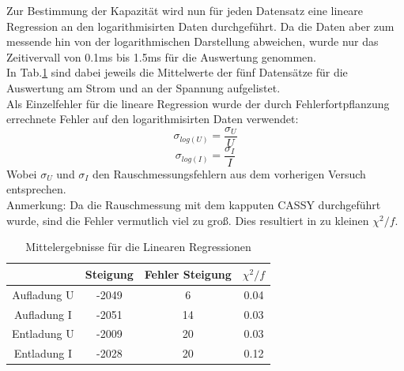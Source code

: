 \documentclass[12pt,a4paper]{article}
\begin{document}
Zur Bestimmung der Kapazität wird nun für jeden Datensatz eine lineare Regression an den logarithmisirten Daten durchgeführt. Da die Daten aber zum messende hin von der logarithmischen Darstellung abweichen, wurde nur das Zeitivervall von 0.1ms bis 1.5ms für die Auswertung genommen.\\
In Tab.\ref{tab:kond_linreg} sind dabei jeweils die Mittelwerte der fünf Datensätze für die Auswertung am Strom und an der Spannung aufgelistet.\\
Als Einzelfehler für die lineare Regression wurde der durch Fehlerfortpflanzung errechnete Fehler auf den logarithmisirten Daten verwendet:
\begin{equation}
\sigma_{log(U)} = \dfrac{\sigma_U}{U}
\end{equation}
\begin{equation}
\sigma_{log(I)} = \dfrac{\sigma_I}{I}
\end{equation}
Wobei $\sigma_U$ und $\sigma_I$ den Rauschmessungsfehlern aus dem vorherigen Versuch entsprechen.\\
Anmerkung: Da die Rauschmessung mit dem kapputen CASSY durchgeführt wurde, sind die Fehler vermutlich viel zu groß. Dies resultiert in zu kleinen $\chi ^{2}/f$.

\begin{table}
\begin{tabular}{|c|c|c|c|}
\hline 
 & Steigung & Fehler Steigung & $\chi ^{2}/f$ \\ 
\hline 
Aufladung U & -2049 & 6 & 0.04 \\ 
\hline 
Aufladung I  & -2051 & 14 & 0.03 \\ 
\hline 
Entladung U & -2009 & 20 & 0.03 \\ 
\hline 
Entladung I  & -2028 & 20 & 0.12 \\ 
\hline 
\end{tabular} 
\caption{Mittelergebnisse für die Linearen Regressionen}
\label{tab:kond_linreg} 
\end{table}
\end{document}

